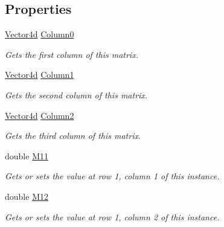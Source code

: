 \subsection*{Properties}
\begin{DoxyCompactItemize}
\item 
\hyperlink{struct_open_t_k_1_1_vector4d}{Vector4d} \hyperlink{struct_open_t_k_1_1_matrix4x3d_a61c78b9d5e1ab66caeee908e64217428}{Column0}
\begin{DoxyCompactList}\small\item\em Gets the first column of this matrix. \end{DoxyCompactList}\item 
\hyperlink{struct_open_t_k_1_1_vector4d}{Vector4d} \hyperlink{struct_open_t_k_1_1_matrix4x3d_a56f5879434c0066b2457bdde2202d2b8}{Column1}
\begin{DoxyCompactList}\small\item\em Gets the second column of this matrix. \end{DoxyCompactList}\item 
\hyperlink{struct_open_t_k_1_1_vector4d}{Vector4d} \hyperlink{struct_open_t_k_1_1_matrix4x3d_a00aba45e803306f9a3930bb9b8aba482}{Column2}
\begin{DoxyCompactList}\small\item\em Gets the third column of this matrix. \end{DoxyCompactList}\item 
double \hyperlink{struct_open_t_k_1_1_matrix4x3d_acb1232a95cd41fbdeacdae7605a86f6b}{M11}
\begin{DoxyCompactList}\small\item\em Gets or sets the value at row 1, column 1 of this instance. \end{DoxyCompactList}\item 
double \hyperlink{struct_open_t_k_1_1_matrix4x3d_a264e44960b59c15bd8db422a71a216bf}{M12}
\begin{DoxyCompactList}\small\item\em Gets or sets the value at row 1, column 2 of this instance. \end{DoxyCompactList}\item 

\end{DoxyCompactItemize}
